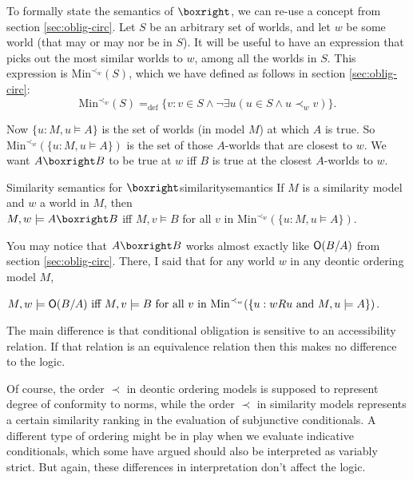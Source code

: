 To formally state the semantics of $\boxright$, we can re-use a concept from
section \ref{sec:oblig-circ}. Let $S$ be an arbitrary set of worlds, and let $w$
be some world (that may or may nor be in $S$). It will be useful to have an
expression that picks out the most similar worlds to $w$, among all the worlds in
$S$. This expression is $\mathrm{Min}^{\prec_w}(S)$, which we have defined as follows in
section \ref{sec:oblig-circ}:
\[
  \mathrm{Min}^{\prec_w}(S) =_\text{def} \{ v: v \in S \land \neg\exists u (u \in S \land u \prec_w v) \}.
\]

Now $\{ u : M,u\models A \}$ is the set of worlds (in model $M$) at which $A$ is
true. So $\mathrm{Min}^{\prec_w}(\{ u : M,u\models A \})$ is the set of those
$A$-worlds that are closest to $w$. We want $A \boxright B$ to be true at $w$
iff $B$ is true at the closest $A$-worlds to $w$.

\begin{definition}{Similarity semantics for $\boxright$}{similaritysemantics}
  If $M$ is a similarity model and $w$ a world in $M$, then\\[1mm]
  $M,w \models A \boxright B$ iff $M,v \models B$ for all
  $v$ in $\mathrm{Min}^{\prec_w}(\{ u: M,u \models A \})$.
\end{definition}

You may notice that $A \boxright B$ works almost exactly like $\operatorname{\mathsf{O}}(B/A)$ from
section \ref{sec:oblig-circ}. There, I said that for any world $w$ in any deontic
ordering model $M$,

\medskip
\quad$M,w \models \Ob (B/A) \text{ iff } M,v \models B\text{ for all $v$ in $\mathrm{Min}^{\prec_w}(\{ u: wRu $ and $M,u\models A \})$}$.

\medskip \noindent%
The main difference is that conditional obligation is sensitive to an
accessibility relation. If that relation is an equivalence relation then this
makes no difference to the logic.


Of course, the order $\prec$ in deontic ordering models is supposed to represent
degree of conformity to norms, while the order $\prec$ in similarity models
represents a certain similarity ranking in the evaluation of subjunctive
conditionals. A different type of ordering might be in play when we evaluate
indicative conditionals, which some have argued should also be interpreted as
variably strict. But again, these differences in interpretation don't affect the
logic.


